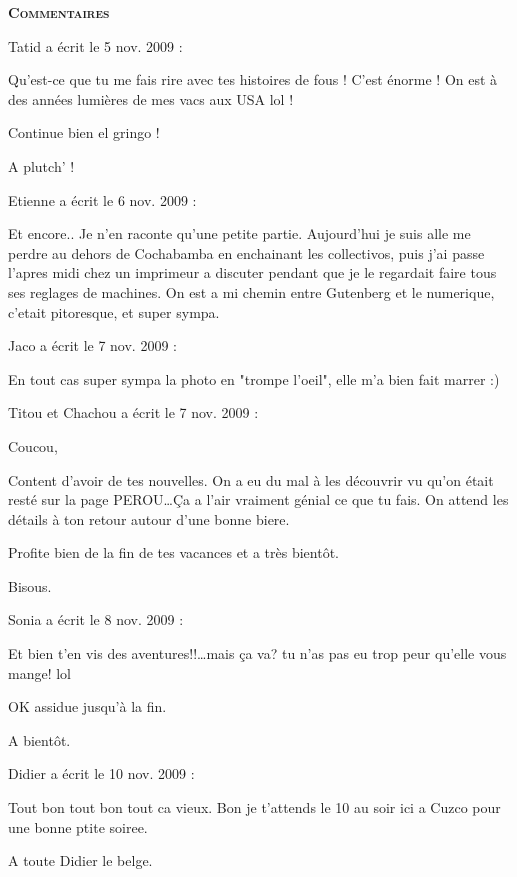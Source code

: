 \bigskip
\textbf{\textsc{Commentaires}}

\medskip
Tatid a écrit le 5 nov. 2009 :
\begin{displayquote}
Qu'est-ce que tu me fais rire avec tes histoires de fous ! C'est énorme ! On est à des années lumières de mes vacs aux USA lol !

Continue bien el gringo !

A plutch' !
\end{displayquote}

\medskip
Etienne a écrit le 6 nov. 2009 :
\begin{displayquote}
Et encore.. Je n'en raconte qu'une petite partie. Aujourd'hui je suis alle me perdre au dehors de Cochabamba en enchainant les collectivos, puis j'ai passe l'apres midi chez un imprimeur a discuter pendant que je le regardait faire tous ses reglages de machines. On est a mi chemin entre Gutenberg et le numerique, c'etait pitoresque, et super sympa.
\end{displayquote}

\medskip
Jaco a écrit le 7 nov. 2009 :
\begin{displayquote}
En tout cas super sympa la photo en "trompe l'oeil", elle m'a bien fait marrer :)
\end{displayquote}

\medskip
Titou et Chachou a écrit le 7 nov. 2009 :
\begin{displayquote}
Coucou,

Content d'avoir de tes nouvelles. On a eu du mal à les découvrir vu qu'on était resté sur la page PEROU\dots Ça a l'air vraiment génial ce que tu fais. On attend les détails à ton retour autour d'une bonne biere.

Profite bien de la fin de tes vacances et a très bientôt.

Bisous.
\end{displayquote}

\medskip
Sonia a écrit le 8 nov. 2009 :
\begin{displayquote}
Et bien t'en vis des aventures!!\dots mais ça va? tu n'as pas eu trop peur qu'elle vous mange! lol

OK assidue jusqu'à la fin.

A bientôt.
\end{displayquote}

\medskip
Didier a écrit le 10 nov. 2009 :
\begin{displayquote}
Tout bon tout bon tout ca vieux. Bon je t'attends le 10 au soir ici a Cuzco pour une bonne ptite soiree.

A toute
Didier le belge.
\end{displayquote}

